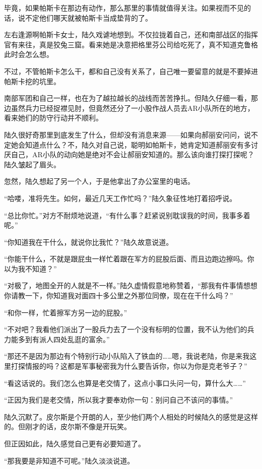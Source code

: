 毕竟，如果帕斯卡在那边有动作，那么那里的事情就值得关注。如果视而不见的话，说不定他们哪天就被帕斯卡当成垫背的了。

左右逢源啊帕斯卡女士，陆久戏谑地想到。不仅拉拢着自己，还和南部战区的指挥官有来往，真是狡兔三窟。看来她是决意把格里芬公司给吃死了，真不知道克鲁格此时会怎么想。

不过，不管帕斯卡怎么干，都和自己没有关系了，自己唯一要留意的就是不要掉进帕斯卡挖的坑里。

南部军团和自己一样，也在为了越拉越长的战线而苦苦挣扎。但陆久仔细一看，那边虽然兵力已经捉襟见肘，但竟然还分了一小股作战人员去AR小队所在的地方，看来她们的防守行动并不顺利。

陆久很好奇那里到底发生了什么，但却没有消息来源——如果向郝丽安问问，说不定她会知道点什么？不，陆久对自己说，聪明如帕斯卡，她肯定知道郝丽安有多讨厌自己，AR小队的动向她是绝对不会让郝丽安知道的。那么该向谁打探打探呢？陆久皱起了眉头。

忽然，陆久想起了另一个人，于是他拿出了办公室里的电话。

“哈喽，准将先生。如何，最近几天工作忙吗？”陆久象征性地打着招呼说。

“总比你忙。”对方不耐烦地说道，“有什么事？赶紧说别耽误我的时间，我事多着呢。”

“你知道我在干什么，就说你比我忙？”陆久故意说道。

“你能干什么，不就是跟屁虫一样忙着跟在军方的屁股后面、而且边跑边擦吗。你以为我不知道？”

“对极了，地图全开的人就是不一样。”陆久虚情假意地称赞着，“那我有件事情想想你请教一下，你知道我对面四十多公里之外那位同僚，现在在干什么吗？”

“和你一样，忙着擦军方另一边的屁股。”

“不对吧？我看他们派出了一股兵力去了一个没有标明的位置，我不认为他们的兵力能多到有派人四处乱逛的富余。”

“那还不是因为那边有个特别行动小队陷入了铁血的……嗯，我说老陆，你是来我这里打探情报的吗？这都是军事秘密我为什么要告诉你，你以为你是克老爷子？”

“看这话说的。我们怎么也算是老交情了，这点小事口头问一句，算什么大……”

“正因为我们是老交情，所以我才要奉劝你一句：别问自己不该问的事情。”

陆久沉默了。皮尔斯是个开朗的人，至少他们两个人相处的时候陆久的感觉是这样的。但刚才的话，皮尔斯不像是开玩笑。

但正因如此，陆久感觉自己更有必要知道了。

“那我要是非知道不可呢。”陆久淡淡说道。

